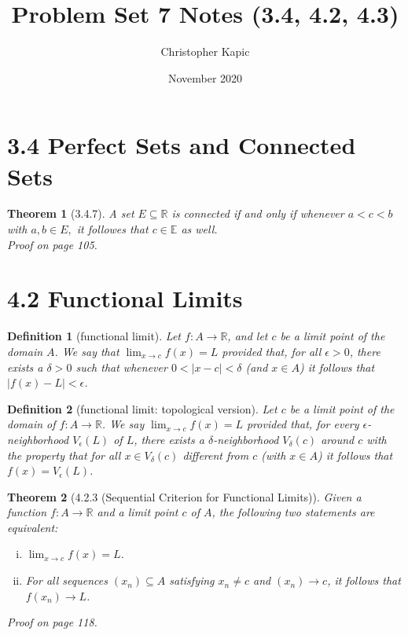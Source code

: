 \documentclass{article}
\title{Problem Set 7 Notes (3.4, 4.2, 4.3)}
\author{Christopher Kapic}
\date{November 2020}
\newtheorem{definition}{Definition}
\newtheorem{theorem}{Theorem}
\begin{document}
\maketitle

\section*{3.4 Perfect Sets and Connected Sets}
\begin{theorem}[3.4.7]
    A set $E \subseteq \mathbb{R}$ is connected if and only if whenever $a < c < b$ with $a,b \in E,$ it followes that $c \in \mathbb{E}$ as well. \\ Proof on page 105.
\end{theorem}

\section*{4.2 Functional Limits}
\begin{definition}[functional limit]
    Let $f:A\rightarrow \mathbb{R}$, and let $c$ be a limit point of the domain $A$. We say that $\lim _{x \rightarrow c}f(x)=L$ provided that, for all $\epsilon > 0$, there exists a $\delta > 0$ such that whenever $0 < |x - c|<\delta$ (and $x \in A$) it follows that $|f(x)-L|<\epsilon$.
\end{definition}

\begin{definition}[functional limit: topological version]
    Let $c$ be a limit point of the domain of $f : A \rightarrow \mathbb{R}$. We say $\lim _{x \rightarrow c}f(x)=L$ provided that, for every $\epsilon$-neighborhood $V_\epsilon (L)$ of $L$, there exists a $\delta$-neighborhood $V_\delta (c)$ around $c$ with the property that for all $x \in V_\delta (c)$ different from $c$ (with $x \in A$) it follows that $f(x)=V_\epsilon (L)$.
\end{definition}

\begin{theorem}[4.2.3 (Sequential Criterion for Functional Limits)]
    Given a function $f:A\rightarrow \mathbb{R}$ and a limit point $c$ of $A$, the following two statements are equivalent:
    \begin{enumerate}[(i)]
        \item $\lim _{x \rightarrow c} f(x)=L$.
        \item For all sequences $(x_n) \subseteq A$ satisfying $x_n \neq c$ and $(x_n)\rightarrow c$, it follows that $f(x_n)\rightarrow L$.
    \end{enumerate}
    Proof on page 118.
\end{theorem}
\end{document}
